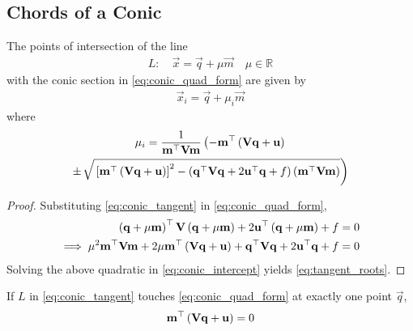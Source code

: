\documentclass[journal,12pt,onecolumn]{IEEEtran}
\begin{document}
\subsection{ Chords of a Conic}
		\begin{theorem}[Chord]
  The points of intersection of the line 
\begin{align}
L: \quad \vec{x} = \vec{q} + \mu \vec{m} \quad \mu \in \mathbb{R}
\label{eq:conic_tangent}
\end{align}
with the conic section in \eqref{eq:conic_quad_form} are given by
\begin{align}
\vec{x}_i = \vec{q} + \mu_i \vec{m}
	\label{eq:chord-pts}
\end{align}
%
where
\begin{multline}
\mu_i = \frac{1}
{
\mathbf{m}^{\top}\mathbf{V}\mathbf{m}
}
\left(-\mathbf{m}^{\top}\left(\mathbf{V}\mathbf{q}+\mathbf{u}\right)\right.
\\
\pm
{\small
\ensuremath{\left.\sqrt{
{}\left[
\mathbf{m}^{\top}\left(\mathbf{V}\mathbf{q}+\mathbf{u}\right)
\right]^2
-
\left(
\mathbf{q}^{\top}\mathbf{V}\mathbf{q} + 2\mathbf{u}^{\top}\mathbf{q} +f
\right)
\left(\mathbf{m}^{\top}\mathbf{V}\mathbf{m}\right)
}
\right)}
}
\label{eq:tangent_roots}
\end{multline}


\end{theorem}
\begin{proof}
  Substituting \eqref{eq:conic_tangent}
in \eqref{eq:conic_quad_form}, 
\begin{align}
\left(\mathbf{q} + \mu \mathbf{m}\right)^{\top}\mathbf{V}\left(\mathbf{q} + \mu \mathbf{m}\right)  + 2 \mathbf{u}^{\top}\left(\mathbf{q} + \mu \mathbf{m}\right)+f &= 0
\\
\implies \mu^2\mathbf{m}^{\top}\mathbf{V}\mathbf{m} + 2 \mu\mathbf{m}^{\top}\left(\mathbf{V}\mathbf{q}+\mathbf{u}\right) 
+ \mathbf{q}^{\top}\mathbf{V}\mathbf{q} + 2\mathbf{u}^{\top}\mathbf{q} +f &= 0
\label{eq:conic_intercept}
\end{align}
Solving the above quadratic in \eqref{eq:conic_intercept}
yields \eqref{eq:tangent_roots}.
\end{proof}
\begin{corollary}
  If $L$ in \eqref{eq:conic_tangent} touches \eqref{eq:conic_quad_form} at exactly one point $\vec{q}$, 
  \begin{align}
  \mathbf{m}^{\top}\left(\mathbf{V}\mathbf{q}+\mathbf{u}\right) = 0
  \label{eq:conic_tangent_mq}
  \end{align}
\end{corollary}
\end{document}
